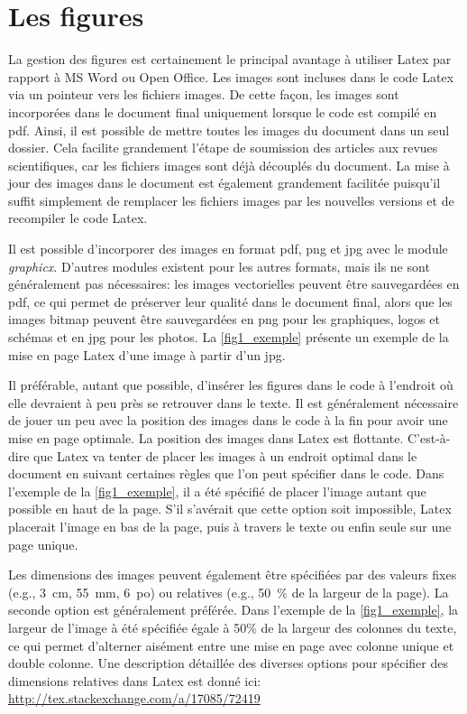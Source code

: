 \documentclass[../exemple_master.tex]{subfiles}
\begin{document}
\section{Les figures}

La gestion des figures est certainement le principal avantage à utiliser Latex par rapport à MS Word ou Open Office. Les images sont incluses dans le code Latex via un pointeur vers les fichiers images. De cette façon, les images sont incorporées dans le document final uniquement lorsque le code est compilé en pdf. Ainsi, il est possible de mettre toutes les images du document dans un seul dossier. Cela facilite grandement l'étape de soumission des articles aux revues scientifiques, car les fichiers images sont déjà découplés du document. 
La mise à jour des images dans le document est également grandement facilitée puisqu'il suffit simplement de remplacer les fichiers images par les nouvelles versions et de recompiler le code Latex.

Il est possible d'incorporer des images en format pdf, png et jpg avec le module \emph{graphicx}. D'autres modules existent pour les autres formats, mais ils ne sont généralement pas nécessaires: les images vectorielles peuvent être sauvegardées en pdf, ce qui permet de préserver leur qualité dans le document final, alors que les images bitmap peuvent être sauvegardées en png pour les graphiques, logos et schémas et en jpg pour les photos. La \cref{fig1_exemple} présente un exemple de la mise en page Latex d'une image à partir d'un jpg.

Il préférable, autant que possible, d'insérer les figures dans le code à l'endroit où elle devraient à peu près se retrouver dans le texte. Il est généralement nécessaire de jouer un peu avec la position des images dans le code à la fin pour avoir une mise en page optimale. La position des images dans Latex est flottante. C'est-à-dire que Latex va tenter de placer les images à un endroit optimal dans le document en suivant certaines règles que l'on peut spécifier dans le code. Dans l'exemple de la \cref{fig1_exemple}, il a été spécifié de placer l'image autant que possible en haut de la page. S'il s'avérait que cette option soit impossible, Latex placerait l'image en bas de la page, puis à travers le texte ou enfin seule sur une page unique.

Les dimensions des images peuvent également être spécifiées par des valeurs fixes (e.g., \SI{3}{cm}, \SI{55}{mm}, \SI{6}{po}) ou relatives (e.g., \SI{50}{\percent} de la largeur de la page). La seconde option est généralement préférée. Dans l'exemple de la \cref{fig1_exemple}, la largeur de l'image à été spécifiée égale à 50\% de la largeur des colonnes du texte, ce qui permet d'alterner aisément entre une mise en page avec colonne unique et double colonne. Une description détaillée des diverses options pour spécifier des dimensions relatives dans Latex est donné ici: \url{http://tex.stackexchange.com/a/17085/72419}
\end{document}
